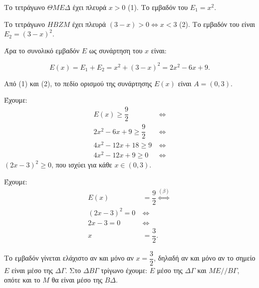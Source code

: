 
\begin{alist}
\item Το τετράγωνο $\Theta M E \Delta$ έχει πλευρά $x > 0$ (1).
Το εμβαδόν του $E_1 = x^2$.

Το τετράγωνο $H B Z M$ έχει πλευρά $(3 - x) > 0 \Leftrightarrow x < 3$ (2).
Το εμβαδόν του είναι $E_2 = (3 - x)^2$.

Άρα το συνολικό εμβαδόν $E$ ως συνάρτηση του $x$ είναι:

\[E(x) = E_1 + E_2 = x^2 + (3 - x)^2 = 2x^2 - 6x + 9.\]

Από (1) και (2), το πεδίο ορισμού της συνάρτησης $E(x)$ είναι $A = (0, 3)$.

\item Έχουμε:
\begin{align*}
E(x) \ge \dfrac{9}{2} \ &\Leftrightarrow \\
2x^2 - 6x + 9 \ge \dfrac{9}{2} \ &\Leftrightarrow \\
4x^2 - 12x + 18 \ge 9 \ &\Leftrightarrow \\
4x^2 - 12x + 9 \ge 0 \ &\Leftrightarrow
\end{align*}
$(2x - 3)^2 \ge 0$, που ισχύει για κάθε $x \in (0, 3)$.

\item Έχουμε:
\begin{align*}
E(x) &= \dfrac{9}{2} \stackrel{(\beta)}{\Leftrightarrow} \\
(2x - 3)^2 = 0 \ &\Leftrightarrow \\
2x - 3 = 0 \ &\Leftrightarrow \\
x &= \dfrac{3}{2}.
\end{align*}

Το εμβαδόν γίνεται ελάχιστο αν και μόνο αν $x = \dfrac{3}{2}$, δηλαδή αν και μόνο αν το σημείο $E$ είναι μέσο της $\Delta \Gamma$. Στο $\Delta B \Gamma$ τρίγωνο έχουμε:
$E$ μέσο της $\Delta \Gamma$ και $ME // B\Gamma$, οπότε και το $M$ θα είναι μέσο της $B\Delta$.
\end{alist}


